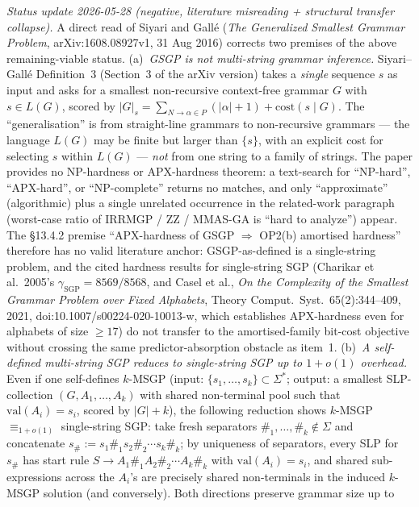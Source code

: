 \documentclass[
]{article}
\begin{document}
\begin{enumerate}
\emph{Status update 2026-05-28 (negative, literature misreading +
structural transfer collapse).} A direct read of Siyari and
Gall\'e (\emph{The Generalized Smallest Grammar Problem},
arXiv:1608.08927v1, 31 Aug 2016) corrects two premises of the
above remaining-viable status. (a)~\emph{GSGP is not multi-string
grammar inference.} Siyari--Gall\'e Definition~3 (Section~3 of
the arXiv version) takes a \emph{single} sequence $s$ as input
and asks for a smallest non-recursive context-free grammar $G$
with $s \in L(G)$, scored by $|G|_s = \sum_{N \to \alpha \in
P}(|\alpha|+1) + \mathrm{cost}(s \mid G)$. The
``generalisation'' is from straight-line grammars to non-recursive
grammars --- the language $L(G)$ may be finite but larger than
$\{s\}$, with an explicit cost for selecting $s$ within $L(G)$
--- \emph{not} from one string to a family of strings. The paper
provides no NP-hardness or APX-hardness theorem: a text-search
for ``NP-hard'', ``APX-hard'', or ``NP-complete'' returns no
matches, and only ``approximate'' (algorithmic) plus a single
unrelated occurrence in the related-work paragraph (worst-case
ratio of IRRMGP / ZZ / MMAS-GA is ``hard to analyze'') appear.
The §13.4.2 premise ``APX-hardness of GSGP $\Rightarrow$ OP2(b)
amortised hardness'' therefore has no valid literature anchor:
GSGP-as-defined is a single-string problem, and the cited
hardness results for single-string SGP (Charikar et al.\ 2005's
$\gamma_{\mathrm{SGP}} = 8569/8568$, and Casel et al., \emph{On
the Complexity of the Smallest Grammar Problem over Fixed
Alphabets}, Theory Comput.\ Syst.\ 65(2):344--409, 2021,
doi:10.1007/s00224-020-10013-w, which establishes APX-hardness
even for alphabets of size $\geq 17$) do not transfer to the
amortised-family bit-cost objective without crossing the same
predictor-absorption obstacle as item~1.
(b)~\emph{A self-defined multi-string SGP reduces to single-string
SGP up to $1+o(1)$ overhead.} Even if one self-defines $k$-MSGP
(input: $\{s_1,\dots,s_k\} \subset \Sigma^*$; output: a smallest
SLP-collection $(G,A_1,\dots,A_k)$ with shared non-terminal pool
such that $\mathrm{val}(A_i)=s_i$, scored by $|G|+k$), the
following reduction shows $k$-MSGP $\equiv_{1+o(1)}$ single-string
SGP: take fresh separators $\#_1,\dots,\#_k \notin \Sigma$ and
concatenate $s_\# := s_1 \#_1 s_2 \#_2 \cdots s_k \#_k$; by
uniqueness of separators, every SLP for $s_\#$ has start rule
$S \to A_1 \#_1 A_2 \#_2 \cdots A_k \#_k$ with $\mathrm{val}(A_i)
= s_i$, and shared sub-expressions across the $A_i$'s are
precisely shared non-terminals in the induced $k$-MSGP solution
(and conversely). Both directions preserve grammar size up to

\end{enumerate}
\end{document}
